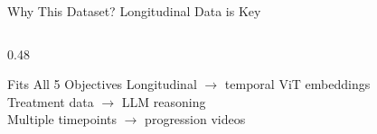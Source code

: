 \documentclass[aspectratio=169,xcolor=dvipsnames]{beamer}
\begin{document}
\begin{frame}{Why This Dataset? Longitudinal Data is Key}
\begin{columns}
\begin{column}{0.48\textwidth}
            \vspace{0.2em}

            \begin{block}{\small Fits All 5 Objectives}
                \scriptsize
                 Longitudinal $\to$ temporal ViT embeddings\\
                 Treatment data $\to$ LLM reasoning\\
                 Multiple timepoints $\to$ progression videos
            \end{block}
        \end{column}
    \end{columns}
\end{frame}

\end{document}
